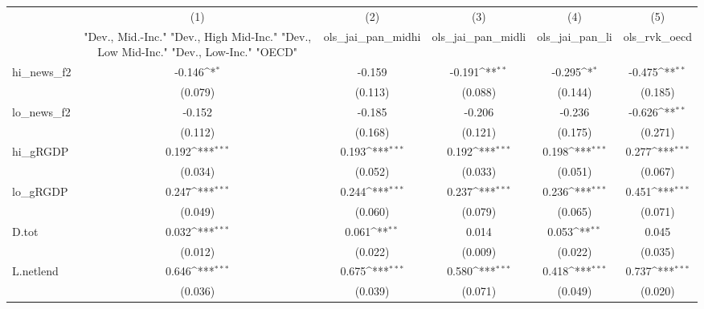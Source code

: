 {
\def\sym#1{\ifmmode^{#1}\else\(^{#1}\)\fi}
\begin{tabular}{l*{5}{c}}
\toprule
            &\multicolumn{1}{c}{(1)}&\multicolumn{1}{c}{(2)}&\multicolumn{1}{c}{(3)}&\multicolumn{1}{c}{(4)}&\multicolumn{1}{c}{(5)}\\
            &\multicolumn{1}{c}{ "Dev., Mid.-Inc." "Dev., High Mid-Inc." "Dev., Low Mid-Inc." "Dev., Low-Inc." "OECD" }&\multicolumn{1}{c}{ols\_jai\_pan\_midhi}&\multicolumn{1}{c}{ols\_jai\_pan\_midli}&\multicolumn{1}{c}{ols\_jai\_pan\_li}&\multicolumn{1}{c}{ols\_rvk\_oecd}\\
\midrule
hi\_news\_f2  &      -0.146\sym{*}  &      -0.159         &      -0.191\sym{**} &      -0.295\sym{*}  &      -0.475\sym{**} \\
            &     (0.079)         &     (0.113)         &     (0.088)         &     (0.144)         &     (0.185)         \\
\addlinespace
lo\_news\_f2  &      -0.152         &      -0.185         &      -0.206         &      -0.236         &      -0.626\sym{**} \\
            &     (0.112)         &     (0.168)         &     (0.121)         &     (0.175)         &     (0.271)         \\
\addlinespace
hi\_gRGDP    &       0.192\sym{***}&       0.193\sym{***}&       0.192\sym{***}&       0.198\sym{***}&       0.277\sym{***}\\
            &     (0.034)         &     (0.052)         &     (0.033)         &     (0.051)         &     (0.067)         \\
\addlinespace
lo\_gRGDP    &       0.247\sym{***}&       0.244\sym{***}&       0.237\sym{***}&       0.236\sym{***}&       0.451\sym{***}\\
            &     (0.049)         &     (0.060)         &     (0.079)         &     (0.065)         &     (0.071)         \\
\addlinespace
D.tot       &       0.032\sym{***}&       0.061\sym{**} &       0.014         &       0.053\sym{**} &       0.045         \\
            &     (0.012)         &     (0.022)         &     (0.009)         &     (0.022)         &     (0.035)         \\
\addlinespace
L.netlend   &       0.646\sym{***}&       0.675\sym{***}&       0.580\sym{***}&       0.418\sym{***}&       0.737\sym{***}\\
            &     (0.036)         &     (0.039)         &     (0.071)         &     (0.049)         &     (0.020)         \\

\end{tabular}}
